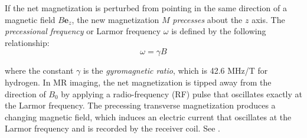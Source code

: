 If the net magnetization is perturbed from pointing in the same direction of a magnetic field $B\bm{e}_z$, the new magnetization $M$ \textit{precesses} about the $z$ axis. The \textit{precessional frequency} or {Larmor frequency} $\omega$ is defined by the following relationship:
\begin{equation}
\omega = \gamma B
\end{equation}

where the constant $\gamma$ is the \textit{gyromagnetic ratio}, which is 42.6 MHz/T for hydrogen. In MR imaging, the net magnetization is tipped away from the direction of $B_0$ by applying a radio-frequency (RF) pulse that oscillates exactly at the Larmor frequency. The precessing transverse magnetization produces a changing magnetic field, which induces an electric current that oscillates at the Larmor frequency and is recorded by the receiver coil. See .

